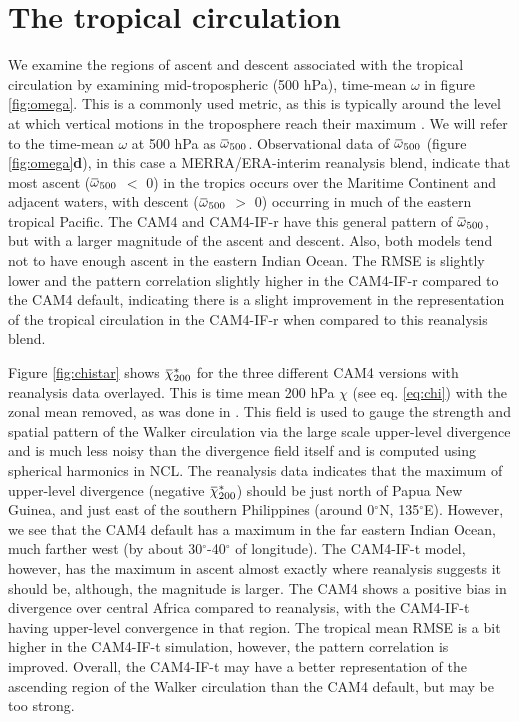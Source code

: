 \documentclass[letterpaper,12pt,titlepage,oneside,final]{book}
\newcommand{\overbar}[1]{\mkern 1.5mu\overline{\mkern-1.5mu#1\mkern-1.5mu}\mkern 1.5mu}
\begin{document}
\section{The tropical circulation}

We examine the regions of ascent and descent associated with the tropical circulation by examining mid-tropospheric (500 hPa), time-mean $\omega$  in figure \ref{fig:omega}. This is a commonly used metric, as this is typically around the level at which vertical motions in the troposphere reach their maximum \citep{vecchi_global_2007}. We will refer to the time-mean $\omega$ at 500 hPa as $\overbar{\omega}_{500}$.
Observational data of $\overbar{\omega}_{500}$ (figure \ref{fig:omega}\textbf{d}), in this case a MERRA/ERA-interim reanalysis blend, indicate that most ascent ($\overbar{\omega}_{500}$ $<$ 0) in the tropics occurs over the Maritime Continent and adjacent waters, with descent ($\overbar{\omega}_{500}$ $>$ 0) occurring in much of the eastern tropical Pacific. The CAM4 and CAM4-IF-r have this general pattern of $\overbar{\omega}_{500}$, but with a larger magnitude of the ascent and descent. Also, both models tend not to have enough ascent in the eastern Indian Ocean. The RMSE is slightly lower and the pattern correlation slightly higher in the CAM4-IF-r compared to the CAM4 default, indicating there is a slight improvement in the representation of the tropical circulation in the CAM4-IF-r when compared to this reanalysis blend.

Figure \ref{fig:chistar} shows $\overbar{\chi}^{*}_{200}$ for the three different CAM4 versions with reanalysis data overlayed. This is time mean 200 hPa $\chi$ (see eq. \ref{eq:chi}) with the zonal mean removed, as was done in \cite{tanaka_trend_2004}. This field is used to gauge the strength and spatial pattern of the Walker circulation via the large scale upper-level divergence and is much less noisy than the divergence field itself and is computed using spherical harmonics in NCL. The reanalysis data indicates that the maximum of upper-level divergence (negative $\overbar{\chi}^{*}_{200}$) should be just north of Papua New Guinea, and just east of the southern Philippines (around 0$^{\circ}$N, 135$^{\circ}$E). However, we see that the CAM4 default has a maximum in the far eastern Indian Ocean, much farther west (by about 30$^{\circ}$-40$^{\circ}$ of longitude). The CAM4-IF-t model, however, has the maximum in ascent almost exactly where reanalysis suggests it should be, although, the magnitude is larger. The CAM4 shows a positive bias in divergence over central Africa compared to reanalysis, with the CAM4-IF-t having upper-level convergence in that region. The tropical mean RMSE is a bit higher in the CAM4-IF-t simulation, however, the pattern correlation is improved. Overall, the CAM4-IF-t may have a better representation of the ascending region of the Walker circulation than the CAM4 default, but may be too strong.
\end{document}
